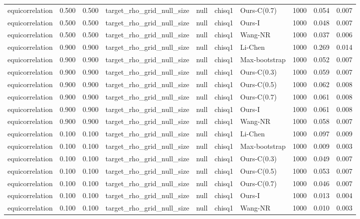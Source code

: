 \begin{tabular}{lrrllllrrr}
equicorrelation & 0.500 & 0.500 & target\_rho\_grid\_null\_size & null & chisq1 & Ours-C(0.7) & 1000 & 0.054 & 0.007 \\
equicorrelation & 0.500 & 0.500 & target\_rho\_grid\_null\_size & null & chisq1 & Ours-I & 1000 & 0.048 & 0.007 \\
equicorrelation & 0.500 & 0.500 & target\_rho\_grid\_null\_size & null & chisq1 & Wang-NR & 1000 & 0.037 & 0.006 \\
equicorrelation & 0.900 & 0.900 & target\_rho\_grid\_null\_size & null & chisq1 & Li-Chen & 1000 & 0.269 & 0.014 \\
equicorrelation & 0.900 & 0.900 & target\_rho\_grid\_null\_size & null & chisq1 & Max-bootstrap & 1000 & 0.052 & 0.007 \\
equicorrelation & 0.900 & 0.900 & target\_rho\_grid\_null\_size & null & chisq1 & Ours-C(0.3) & 1000 & 0.059 & 0.007 \\
equicorrelation & 0.900 & 0.900 & target\_rho\_grid\_null\_size & null & chisq1 & Ours-C(0.5) & 1000 & 0.062 & 0.008 \\
equicorrelation & 0.900 & 0.900 & target\_rho\_grid\_null\_size & null & chisq1 & Ours-C(0.7) & 1000 & 0.061 & 0.008 \\
equicorrelation & 0.900 & 0.900 & target\_rho\_grid\_null\_size & null & chisq1 & Ours-I & 1000 & 0.061 & 0.008 \\
equicorrelation & 0.900 & 0.900 & target\_rho\_grid\_null\_size & null & chisq1 & Wang-NR & 1000 & 0.058 & 0.007 \\
equicorrelation & 0.100 & 0.100 & target\_rho\_grid\_null\_size & null & chisq1 & Li-Chen & 1000 & 0.097 & 0.009 \\
equicorrelation & 0.100 & 0.100 & target\_rho\_grid\_null\_size & null & chisq1 & Max-bootstrap & 1000 & 0.009 & 0.003 \\
equicorrelation & 0.100 & 0.100 & target\_rho\_grid\_null\_size & null & chisq1 & Ours-C(0.3) & 1000 & 0.049 & 0.007 \\
equicorrelation & 0.100 & 0.100 & target\_rho\_grid\_null\_size & null & chisq1 & Ours-C(0.5) & 1000 & 0.053 & 0.007 \\
equicorrelation & 0.100 & 0.100 & target\_rho\_grid\_null\_size & null & chisq1 & Ours-C(0.7) & 1000 & 0.046 & 0.007 \\
equicorrelation & 0.100 & 0.100 & target\_rho\_grid\_null\_size & null & chisq1 & Ours-I & 1000 & 0.013 & 0.004 \\
equicorrelation & 0.100 & 0.100 & target\_rho\_grid\_null\_size & null & chisq1 & Wang-NR & 1000 & 0.010 & 0.003 \\

\end{tabular}
